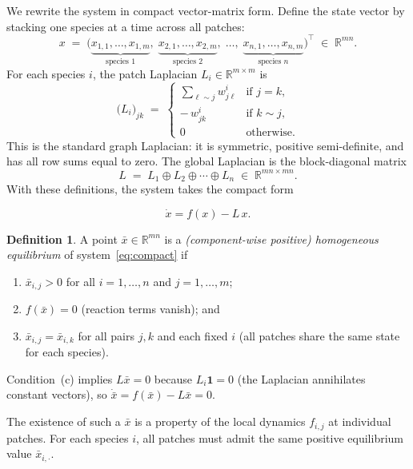 \documentclass[12pt,a4paper]{article}
\theoremstyle{definition}
\newtheorem{definition}[theorem]{Definition}
\begin{document}
We rewrite the system in compact vector-matrix form. Define the state vector by stacking one species at a time across all patches:
\[
x
\;=\;
\bigl(
\underbrace{x_{1,1},\ldots,x_{1,m}}_{\text{species 1}},\;
\underbrace{x_{2,1},\ldots,x_{2,m}}_{\text{species 2}},\;
\ldots,\;
\underbrace{x_{n,1},\ldots,x_{n,m}}_{\text{species }n}
\bigr)^{\!\top}
\;\in\; \mathbb{R}^{mn}.
\]
For each species \(i\), the patch Laplacian \(L_i \in \mathbb{R}^{m \times m}\) is
\[
\bigl(L_i\bigr)_{jk}
\;=\;
\begin{cases}
\displaystyle\sum_{\ell \sim j} w^{i}_{j\ell}
& \text{if } j = k, \\[6pt]
-\,w^{i}_{jk}
& \text{if } k \sim j, \\[4pt]
0 & \text{otherwise.}
\end{cases}
\]
This is the standard graph Laplacian: it is symmetric, positive semi-definite, and has all row sums equal to zero. The global Laplacian is the block-diagonal matrix
\[
L
\;=\;
L_1 \oplus L_2 \oplus \cdots \oplus L_n
\;\in\; \mathbb{R}^{mn \times mn}.
\]
With these definitions, the system takes the compact form

\begin{equation}
\dot{x} = f(x) - L\,x.
\label{eq:compact}
\end{equation}


\begin{definition}
\label{def:equil}
A point $\bar{x} \in \mathbb{R}^{mn}$ is a \emph{(component-wise positive) homogeneous equilibrium} of
system~\eqref{eq:compact} if
\begin{enumerate}[label=(\alph*),itemsep=2pt]
  \item $\bar{x}_{i,j} > 0$ for all $i = 1,\ldots,n$ and
        $j = 1,\ldots,m$;
  \item $f(\bar{x}) = 0$ \quad (reaction terms vanish); and
  \item $\bar{x}_{i,j} = \bar{x}_{i,k}$ for all pairs $j,k$ and
        each fixed $i$ \quad (all patches share the same state for
        each species).
\end{enumerate}
Condition~(c) implies $L\bar{x} = 0$ because $L_i\mathbf{1} = 0$
(the Laplacian annihilates constant vectors), so
$\dot{\bar{x}} = f(\bar{x}) - L\bar{x} = 0$.
\end{definition}


The existence of such a $\bar{x}$ is a property of the local dynamics $f_{i,j}$ at individual patches. For each species $i$, all patches must admit the same positive equilibrium value $\bar{x}_{i,\cdot}$.
\end{document}
